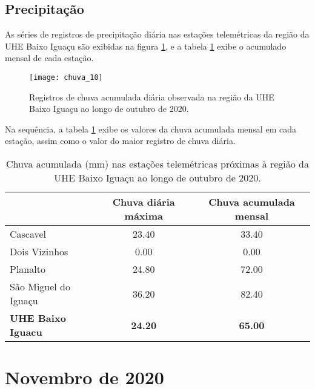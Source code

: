 \documentclass[a4paper,12pt]{article}
\begin{document}
\newpage


                   \subsection{Precipitação}
                   \hspace{0.5cm} As séries de registros de precipitação diária nas estações telemétricas da região da UHE Baixo Iguaçu são exibidas na figura \ref{fig:figchuva}, e a
                   tabela \ref{tab:tabchuva} exibe o acumulado mensal de cada estação.

    \begin{figure}[!htb]
    \texttt{[image: chuva\_10]}
    \caption{Registros de chuva acumulada diária observada na região da UHE Baixo Iguaçu ao longo de outubro de 2020.}
    \label{fig:figchuva}
    \end{figure}
    
    Na sequência, a tabela \ref{tab:tabchuva} exibe os valores da chuva acumulada mensal em cada estação, 
    assim como o valor do maior registro de chuva diária.
    
    \begin{table}[!htb]
    \centering
    \caption{Chuva acumulada (mm) nas estações telemétricas próximas à região da UHE Baixo Iguaçu ao longo de outubro de 2020.}
    \label{tab:tabchuva}
    \begin{tabular}{lcc}
    \hline
                           & Chuva diária máxima      &   Chuva acumulada mensal \\
    \hline
      Cascavel                   &  23.40                   &   33.40    \\
      Dois Vizinhos                   &  0.00                   &   0.00    \\
      Planalto                   &  24.80                   &   72.00    \\
      São Miguel do Iguaçu                   &  36.20                   &   82.40    \\
      \textbf{UHE Baixo Iguacu}                   &  \textbf{24.20}                   &   \textbf{65.00}     \\
    \hline
    \end{tabular}
    \end{table}
        

\newpage
\section{Novembro de 2020}
\end{document}
